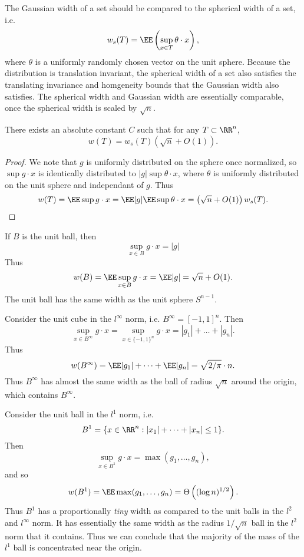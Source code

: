 The Gaussian width of a set should be compared to the spherical width of a set, i.e.
%
\[ w_s(T) = \EE \left( \sup_{x \in T} \theta \cdot x \right), \]
%
where $\theta$ is a uniformly randomly chosen vector on the unit sphere. Because the distribution is translation invariant, the spherical width of a set also satisfies the translating invariance and homgeneity bounds that the Gaussian width also satisfies. The spherical width and Gaussian width are essentially comparable, once the spherical width is scaled by $\sqrt{n}$.

\begin{theorem}
	There exists an absolute constant $C$ such that for any $T \subset \RR^n$,
	\[ w(T) = w_s(T) \left(\sqrt{n} + O(1) \right). \]
\end{theorem}
\begin{proof}
	We note that $g$ is uniformly distributed on the sphere once normalized, so $\sup g \cdot x$ is identically distributed to $|g| \sup \theta \cdot x$, where $\theta$ is uniformly distributed on the unit sphere and independant of $g$. Thus
	\[ w(T) = \EE \sup g \cdot x = \EE |g| \EE \sup \theta \cdot x = \left( \sqrt{n} + O(1) \right) w_s(T). \qedhere \]
\end{proof}

\begin{example}
	If $B$ is the unit ball, then
	\[ \sup_{x \in B} g \cdot x = |g| \]
	Thus
	\[ w(B) = \EE \sup_{x \in B} g \cdot x = \EE |g| = \sqrt{n} + O(1). \]
	The unit ball has the same width as the unit sphere $S^{n-1}$.
\end{example}

\begin{example}
	Consider the unit cube in the $l^\infty$ norm, i.e. $B^\infty = [-1,1]^n$. Then
	\[ \sup_{x \in B^\infty} g \cdot x = \sup_{x \in \{ -1, 1 \}^n} g \cdot x = |g_1| + \dots + |g_n|. \]
	Thus
	\[ w(B^\infty) = \EE |g_1| + \dots + \EE |g_n| = \sqrt{2/\pi} \cdot n. \]
	Thus $B^\infty$ has almost the same width as the ball of radius $\sqrt{n}$ around the origin, which contains $B^\infty$.
\end{example}

\begin{example}
	Consider the unit ball in the $l^1$ norm, i.e.
	\[ B^1 = \{ x \in \RR^n: |x_1| + \dots + |x_n| \leq 1 \}. \]
	Then
	\[ \sup_{x \in B^1} g \cdot x = \max(g_1, \dots, g_n), \]
	and so
	\[ w(B^1) = \EE \max(g_1, \dots, g_n) = \Theta \left( (\log n)^{1/2} \right). \]
	Thus $B^1$ has a proportionally \emph{tiny} width as compared to the unit balls in the $l^2$ and $l^\infty$ norm. It has essentially the same width as the radius $1/\sqrt{n}$ ball in the $l^2$ norm that it contains. Thus we can conclude that the majority of the mass of the $l^1$ ball is concentrated near the origin.
\end{example}

